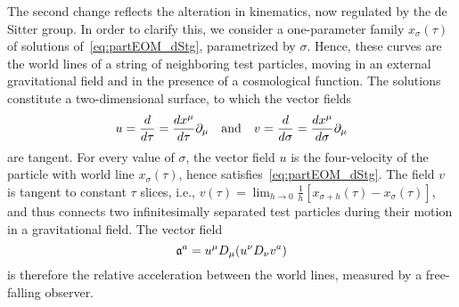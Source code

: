 \documentclass[
final,
11pt,
a4paper,
DIV=11,
headinclude=true,
footinclude=false,
bibliography=totoc,
twoside=true,  %
BCOR=5mm
]{scrbook}
\begin{document}
The second change reflects the alteration in kinematics, now 
regulated by the de Sitter group. In order to clarify this, we 
consider a one-parameter family $x_\sigma(\tau)$ of solutions 
of~\eqref{eq:partEOM_dStg}, parametrized by $\sigma$. Hence, 
these curves are the world lines of a string of neighboring test 
particles, moving in an external gravitational field and in the 
presence of a cosmological function. The solutions constitute 
a two-dimensional surface, to which the vector fields
\begin{equation*}
  u = \frac{d}{d\tau} = \frac{dx^\mu}{d\tau} \partial_\mu
  \quad\text{and}\quad
  v = \frac{d}{d\sigma} = \frac{dx^\mu}{d\sigma} \partial_\mu
\end{equation*}
are tangent. For every value of $\sigma$, the vector field $u$ is 
the four-velocity of the particle with world line 
$x_\sigma(\tau)$, hence satisfies~\eqref{eq:partEOM_dStg}.  The 
field $v$ is tangent to constant $\tau$ slices, i.e., $v(\tau) 
= \lim_{h \to 0} \tfrac{1}{h} [x_{\sigma + h}(\tau) 
- x_\sigma(\tau)]$, and thus connects two infinitesimally 
separated test particles during their motion in a gravitational 
field. The vector field~\cite{carroll:sg}
\begin{equation*}
  \mathfrak{a}^a = u^\mu D_\mu (u^\nu D_\nu v^a)
\end{equation*}
is therefore the relative acceleration between the world lines, 
measured by a free-falling observer.
\end{document}
